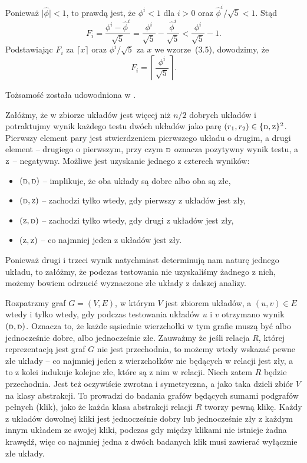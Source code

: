\subexercise{} %
Ponieważ $\bigl|\widehat\phi\bigr|<1$, to prawdą jest, że $\phi^i<1$ dla $i>0$ oraz $\widehat\phi^i/\sqrt{5}<1$. Stąd
\[
	F_i = \frac{\phi^i-\widehat\phi^i}{\sqrt{5}} = \frac{\phi^i}{\sqrt{5}}-\frac{\widehat\phi^i}{\sqrt{5}} < \frac{\phi^i}{\sqrt{5}}-1.
\]
Podstawiając $F_i$ za $\lceil x\rceil$ oraz $\phi^i/\sqrt{5}$ za $x$ we wzorze~(3.5), dowodzimy, że
\[
	F_i = \left\lceil\frac{\phi^i}{\sqrt{5}}\right\rceil.
\]

\subexercise{} %
Tożsamość została udowodniona w .


\subexercise{} %
Załóżmy, że w zbiorze układów jest więcej niż $n/2$ dobrych układów i potraktujmy wynik każdego testu dwóch układów jako parę $(r_1,r_2)\in\{{\scriptstyle\rm D},{\scriptstyle\rm Z}\}^2$. Pierwszy element pary jest stwierdzeniem pierwszego układu o drugim, a drugi element -- drugiego o pierwszym, przy czym ${\scriptstyle\rm D}$ oznacza pozytywny wynik testu, a~${\scriptstyle\rm Z}$ -- negatywny. Możliwe jest uzyskanie jednego z czterech wyników:
\begin{itemize}
	\item $({\scriptstyle\rm D},{\scriptstyle\rm D})$ -- implikuje, że oba układy są dobre albo oba są złe,
	\item $({\scriptstyle\rm D},{\scriptstyle\rm Z})$ -- zachodzi tylko wtedy, gdy pierwszy z układów jest zły,
	\item $({\scriptstyle\rm Z},{\scriptstyle\rm D})$ -- zachodzi tylko wtedy, gdy drugi z układów jest zły,
	\item $({\scriptstyle\rm Z},{\scriptstyle\rm Z})$ -- co najmniej jeden z układów jest zły.
\end{itemize}
Ponieważ drugi i trzeci wynik natychmiast determinują nam naturę jednego układu, to załóżmy, że podczas testowania nie uzyskaliśmy żadnego z nich, możemy bowiem odrzucić wyznaczone złe układy z dalszej analizy.

Rozpatrzmy graf $G=(V,E)$, w którym $V$ jest zbiorem układów, a $(u,v)\in E$ wtedy i tylko wtedy, gdy podczas testowania układów $u$ i $v$ otrzymano wynik $({\scriptstyle\rm D},{\scriptstyle\rm D})$. Oznacza to, że każde sąsiednie wierzchołki w tym grafie muszą być albo jednocześnie dobre, albo jednocześnie złe. Zauważmy że jeśli relacja $R$, której reprezentacją jest graf $G$ nie jest przechodnia, to możemy wtedy wskazać pewne złe układy -- co najmniej jeden z wierzchołków nie będących w relacji jest zły, a to z kolei indukuje kolejne złe, które są z nim w relacji. Niech zatem $R$ będzie przechodnia. Jest też oczywiście zwrotna i symetryczna, a jako taka dzieli zbiór $V$ na klasy abstrakcji. To prowadzi do badania grafów będących sumami podgrafów pełnych (klik), jako że każda klasa abstrakcji relacji $R$ tworzy pewną klikę. Każdy z układów dowolnej kliki jest jednocześnie dobry lub jednocześnie zły z każdym innym układem ze swojej kliki, podczas gdy między klikami nie istnieje żadna krawędź, więc co najmniej jedna z dwóch badanych klik musi zawierać wyłącznie złe układy.

